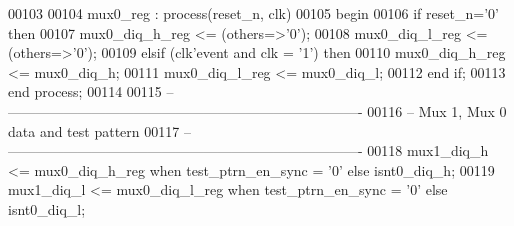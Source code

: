 \begin{DoxyCode}
00103 
00104  mux0\_reg : \textcolor{keywordflow}{process}(reset_n, clk)
00105 \textcolor{vhdlkeyword}{    begin}
00106       \textcolor{keywordflow}{if} \textcolor{vhdlchar}{reset_n}\textcolor{vhdlchar}{=}\textcolor{vhdlchar}{'}\textcolor{vhdllogic}{}\textcolor{vhdllogic}{0}\textcolor{vhdlchar}{'} \textcolor{keywordflow}{then}
00107          \textcolor{vhdlchar}{mux0_diq_h_reg} \textcolor{vhdlchar}{<=} \textcolor{vhdlchar}{(}\textcolor{keywordflow}{others}\textcolor{vhdlchar}{=}\textcolor{vhdlchar}{>}\textcolor{vhdlchar}{'}\textcolor{vhdllogic}{}\textcolor{vhdllogic}{0}\textcolor{vhdlchar}{'}\textcolor{vhdlchar}{)};
00108          \textcolor{vhdlchar}{mux0_diq_l_reg} \textcolor{vhdlchar}{<=} \textcolor{vhdlchar}{(}\textcolor{keywordflow}{others}\textcolor{vhdlchar}{=}\textcolor{vhdlchar}{>}\textcolor{vhdlchar}{'}\textcolor{vhdllogic}{}\textcolor{vhdllogic}{0}\textcolor{vhdlchar}{'}\textcolor{vhdlchar}{)};
00109       \textcolor{keywordflow}{elsif} \textcolor{vhdlchar}{(}\textcolor{vhdlchar}{clk}\textcolor{vhdlchar}{'}\textcolor{vhdlkeyword}{event} \textcolor{keywordflow}{and} \textcolor{vhdlchar}{clk} \textcolor{vhdlchar}{=} \textcolor{vhdlchar}{'}\textcolor{vhdllogic}{}\textcolor{vhdllogic}{1}\textcolor{vhdlchar}{'}\textcolor{vhdlchar}{)} \textcolor{keywordflow}{then}
00110           \textcolor{vhdlchar}{mux0_diq_h_reg} \textcolor{vhdlchar}{<=} \textcolor{vhdlchar}{mux0_diq_h};
00111           \textcolor{vhdlchar}{mux0_diq_l_reg} \textcolor{vhdlchar}{<=} \textcolor{vhdlchar}{mux0_diq_l};         
00112         \textcolor{keywordflow}{end} \textcolor{keywordflow}{if};
00113     \textcolor{keywordflow}{end} \textcolor{keywordflow}{process};
00114     
00115 \textcolor{keyword}{-- ----------------------------------------------------------------------------}
00116 \textcolor{keyword}{-- Mux 1, Mux 0 data and test pattern}
00117 \textcolor{keyword}{-- ----------------------------------------------------------------------------        }
00118 \textcolor{vhdlchar}{mux1_diq_h} \textcolor{vhdlchar}{<=} \textcolor{vhdlchar}{mux0_diq_h_reg} \textcolor{keywordflow}{when} \textcolor{vhdlchar}{test_ptrn_en_sync} \textcolor{vhdlchar}{=} \textcolor{vhdlchar}{'}\textcolor{vhdllogic}{}\textcolor{vhdllogic}{0}\textcolor{vhdlchar}{'} \textcolor{keywordflow}{else} \textcolor{vhdlchar}{isnt0_diq_h};
00119 \textcolor{vhdlchar}{mux1_diq_l} \textcolor{vhdlchar}{<=} \textcolor{vhdlchar}{mux0_diq_l_reg} \textcolor{keywordflow}{when} \textcolor{vhdlchar}{test_ptrn_en_sync} \textcolor{vhdlchar}{=} \textcolor{vhdlchar}{'}\textcolor{vhdllogic}{}\textcolor{vhdllogic}{0}\textcolor{vhdlchar}{'} \textcolor{keywordflow}{else} \textcolor{vhdlchar}{isnt0_diq_l};

\end{DoxyCode}
